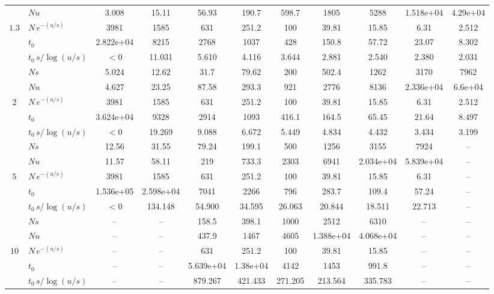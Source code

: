 \documentclass{imsart}
\theoremstyle{plain}
\theoremstyle{definition}
\begin{document}
\begin{appendix}
\begin{table}[H]
\begin{adjustbox}{max width=\textwidth, max totalheight=0.9\textheight, center}
\begin{tabular}{c lccccccccc}
 & $Nu$ & 3.008 & 15.11 & 56.93 & 190.7 & 598.7 & 1805 & 5288 & 1.518e+04 & 4.29e+04 \\
$1.3$ & $N\,e^{-(u/s)}$ & 3981 & 1585 & 631 & 251.2 & 100 & 39.81 & 15.85 & 6.31 & 2.512 \\
 & $t_0$ & 2.822e+04 & 8215 & 2768 & 1037 & 428 & 150.8 & 57.72 & 23.07 & 8.302 \\
 & $t_0\,s/\log(u/s)$ & $<0$ & 11.031 & 5.610 & 4.116 & 3.644 & 2.881 & 2.540 & 2.380 & 2.031 \\
\midrule
 & $Ns$ & 5.024 & 12.62 & 31.7 & 79.62 & 200 & 502.4 & 1262 & 3170 & 7962 \\
 & $Nu$ & 4.627 & 23.25 & 87.58 & 293.3 & 921 & 2776 & 8136 & 2.336e+04 & 6.6e+04 \\
$2$ & $N\,e^{-(u/s)}$ & 3981 & 1585 & 631 & 251.2 & 100 & 39.81 & 15.85 & 6.31 & 2.512 \\
 & $t_0$ & 3.624e+04 & 9328 & 2914 & 1093 & 416.1 & 164.5 & 65.45 & 21.64 & 8.497 \\
 & $t_0\,s/\log(u/s)$ & $<0$ & 19.269 & 9.088 & 6.672 & 5.449 & 4.834 & 4.432 & 3.434 & 3.199 \\
\midrule
 & $Ns$ & 12.56 & 31.55 & 79.24 & 199.1 & 500 & 1256 & 3155 & 7924 & -- \\
 & $Nu$ & 11.57 & 58.11 & 219 & 733.3 & 2303 & 6941 & 2.034e+04 & 5.839e+04 & -- \\
$5$ & $N\,e^{-(u/s)}$ & 3981 & 1585 & 631 & 251.2 & 100 & 39.81 & 15.85 & 6.31 & -- \\
 & $t_0$ & 1.536e+05 & 2.598e+04 & 7041 & 2266 & 796 & 283.7 & 109.4 & 57.24 & -- \\
 & $t_0\,s/\log(u/s)$ & $<0$ & 134.148 & 54.900 & 34.595 & 26.063 & 20.844 & 18.511 & 22.713 & -- \\
\midrule
 & $Ns$ & -- & -- & 158.5 & 398.1 & 1000 & 2512 & 6310 & -- & -- \\
 & $Nu$ & -- & -- & 437.9 & 1467 & 4605 & 1.388e+04 & 4.068e+04 & -- & -- \\
$10$ & $N\,e^{-(u/s)}$ & -- & -- & 631 & 251.2 & 100 & 39.81 & 15.85 & -- & -- \\
 & $t_0$ & -- & -- & 5.639e+04 & 1.38e+04 & 4142 & 1453 & 991.8 & -- & -- \\
 & $t_0\,s/\log(u/s)$ & -- & -- & 879.267 & 421.433 & 271.205 & 213.564 & 335.783 & -- & -- \\
\bottomrule
\end{tabular}
\end{adjustbox}
\end{table}
\end{appendix}
\end{document}
